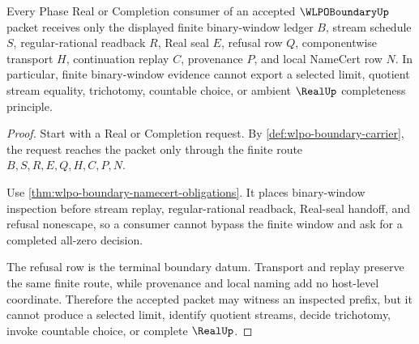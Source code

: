 \begin{theorem}
\label{thm:wlpo-boundary-real-completion-refusal}
Every Phase Real or Completion consumer of an accepted $\WLPOBoundaryUp$ packet receives only the displayed finite binary-window ledger $B$, stream schedule $S$, regular-rational readback $R$, Real seal $E$, refusal row $Q$, componentwise transport $H$, continuation replay $C$, provenance $P$, and local NameCert row $N$. In particular, finite binary-window evidence cannot export a selected limit, quotient stream equality, trichotomy, countable choice, or ambient $\RealUp$ completeness principle.
\end{theorem}
\begin{proof}
Start with a Real or Completion request. By \autoref{def:wlpo-boundary-carrier}, the request reaches the packet only through the finite route $B,S,R,E,Q,H,C,P,N$.

Use \autoref{thm:wlpo-boundary-namecert-obligations}. It places binary-window inspection before stream replay, regular-rational readback, Real-seal handoff, and refusal nonescape, so a consumer cannot bypass the finite window and ask for a completed all-zero decision.

The refusal row is the terminal boundary datum. Transport and replay preserve the same finite route, while provenance and local naming add no host-level coordinate. Therefore the accepted packet may witness an inspected prefix, but it cannot produce a selected limit, identify quotient streams, decide trichotomy, invoke countable choice, or complete $\RealUp$.
\end{proof}




